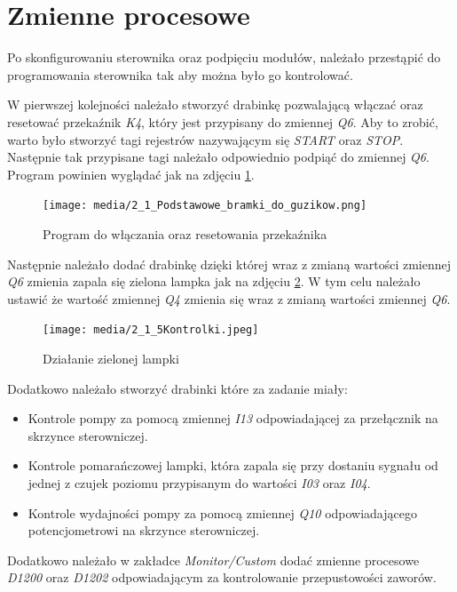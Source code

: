 \documentclass{article}
\begin{document}
\newpage
\section{Zmienne procesowe}
Po skonfigurowaniu sterownika oraz podpięciu modułów, należało przestąpić do programowania sterownika tak aby można było go kontrolować. 

W pierwszej kolejności należało stworzyć drabinkę pozwalającą włączać oraz resetować przekaźnik \textit{K4}, który jest przypisany do zmiennej \textit{Q6}. Aby to zrobić, warto było stworzyć tagi rejestrów nazywającym się \textit{START} oraz \textit{STOP}. Następnie tak przypisane tagi należało odpowiednio podpiąć do zmiennej \textit{Q6}. Program powinien wyglądać jak na zdjęciu \ref{fig:zdj9}.

\begin{figure}[H]
    \centering
    \texttt{[image: media/2\_1\_Podstawowe\_bramki\_do\_guzikow.png]}
    \caption{Program do włączania oraz resetowania przekaźnika}
    \label{fig:zdj9}
\end{figure}

Następnie należało dodać drabinkę dzięki której wraz z zmianą wartości zmiennej \textit{Q6} zmienia zapala się zielona lampka jak na zdjęciu \ref{fig:zdj10}. W tym celu należało ustawić że wartość zmiennej \textit{Q4} zmienia się wraz z zmianą wartości zmiennej \textit{Q6}. 

\begin{figure}[H]
    \centering
    \texttt{[image: media/2\_1\_5Kontrolki.jpeg]}
    \caption{Działanie zielonej lampki}
    \label{fig:zdj10}
\end{figure}

Dodatkowo należało stworzyć drabinki które za zadanie miały:
\begin{itemize}
    \item Kontrole pompy za pomocą zmiennej \textit{I13} odpowiadającej za przełącznik na skrzynce sterowniczej.
    \item Kontrole pomarańczowej lampki, która zapala się przy dostaniu sygnału od jednej z czujek poziomu przypisanym do wartości \textit{I03} oraz \textit{I04}.
    \item Kontrole wydajności pompy za pomocą zmiennej \textit{Q10} odpowiadającego potencjometrowi na skrzynce sterowniczej.
\end{itemize}

Dodatkowo należało w zakładce \textit{Monitor/Custom} dodać zmienne procesowe \textit{D1200} oraz \textit{D1202} odpowiadającym za kontrolowanie przepustowości zaworów.
\end{document}
